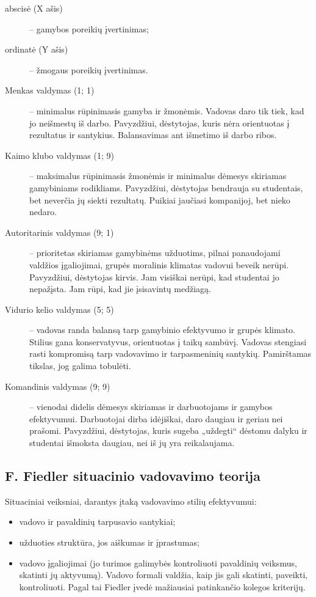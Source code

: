\begin{description}
  \item[abscisė (X ašis)] – gamybos poreikių įvertinimas;
  \item[ordinatė (Y ašis)] – žmogaus poreikių įvertinimas.
\end{description}

\begin{description}
  \item[Menkas valdymas (1; 1)] – minimalus rūpinimasis gamyba ir žmonėmis.
    Vadovas daro tik tiek, kad jo neišmestų iš darbo. Pavyzdžiui,
    dėstytojas, kuris nėra orientuotas į rezultatus ir santykius.
    Balansavimas ant išmetimo iš darbo ribos.
  \item[Kaimo klubo valdymas (1; 9)] – maksimalus rūpinimasis žmonėmis
    ir minimalus dėmesys skiriamas gamybiniams rodikliams. Pavyzdžiui,
    dėstytojas bendrauja su studentais, bet neverčia jų siekti
    rezultatų. Puikiai jaučiasi kompanijoj, bet nieko nedaro.
  \item[Autoritarinis valdymas (9; 1)] – prioritetas skiriamas gamybinėms
    užduotims, pilnai panaudojami valdžios įgaliojimai, grupės moralinis
    klimatas vadovui beveik nerūpi. Pavyzdžiui, dėstytojas kirvis.
    Jam visiškai nerūpi, kad studentai jo nepažįsta. Jam rūpi, kad jie
    įsisavintų medžiagą.
  \item[Vidurio kelio valdymas (5; 5)] – vadovas randa balansą tarp
    gamybinio efektyvumo ir grupės klimato. Stilius gana konservatyvus,
    orientuotas į taikų sambūvį. Vadovas stengiasi rasti kompromisą
    tarp vadovavimo ir tarpasmeninių santykių. Pamirštamas tikslas,
    jog galima tobulėti.
  \item[Komandinis valdymas (9; 9)] – vienodai didelis dėmesys skiriamas
    ir darbuotojams ir gamybos efektyvumui. Darbuotojai dirba idėjiškai,
    daro daugiau ir geriau nei prašomi. Pavyzdžiui, dėstytojas, kuris
    sugeba „uždegti“ dėstomu dalyku ir studentai išmoksta daugiau, nei
    iš jų yra reikalaujama.
\end{description}

\subsection{F. Fiedler situacinio vadovavimo teorija}

Situaciniai veiksniai, darantys įtaką vadovavimo stilių efektyvumui:
\begin{itemize}
  \item vadovo ir pavaldinių tarpusavio santykiai;
  \item užduoties struktūra, jos aiškumas ir įprastumas;
  \item vadovo įgaliojimai (jo turimos galimybės kontroliuoti pavaldinių
    veiksmus, skatinti jų aktyvumą). Vadovo formali valdžia, kaip jis
    gali skatinti, paveikti, kontroliuoti. Pagal tai Fiedler įvedė
    mažiausiai patinkančio kolegos kriterijų.
\end{itemize}

